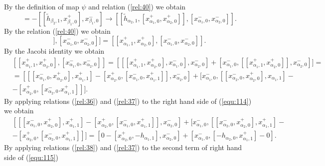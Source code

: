 \documentclass[english]{elsarticle}
\numberwithin{equation}{section}
\begin{document}
By the definition of map $\psi$ and relation (\ref{rel:40}) we obtain
\begin{equation}
    [x_{\beta_{1},1}^{+},x_{\beta_{1},0}^{-}] = -[[\tilde{h}_{\beta_2,1},x_{\beta_1,0}^+], x_{\beta_1,0}^-]\rightarrow[[\tilde{h}_{\alpha_{2},1}, [x_{\alpha_{1},0}^{+},x_{\alpha_{2},0}^{+}]], [x_{\alpha_{1},0}^{-},x_{\alpha_{2},0}^{-}]].
\end{equation}
By the relation (\ref{rel:40}) we obtain
\begin{equation}
[[\tilde{h}_{\alpha_{2},1},[x_{\alpha_{1},0}^{+},x_{\alpha_{2},0}^{+}]],[x_{\alpha_{1},0}^{-},x_{\alpha_{2},0}^{-}]] = [[x_{\alpha_{1},1}^{+},x_{\alpha_{2},0}^{+}],[x_{\alpha_{1},0}^{-},x_{\alpha_{2},0}^{-}]].
\end{equation}
By the Jacobi identity we obtain
\begin{equation}
\label{equ:114}
\begin{split}
&[[x_{\alpha_{1},1}^{+},x_{\alpha_{2},0}^{+}],[x_{\alpha_{1},0}^{-},x_{\alpha_{2},0}^{-}]]=[[[x_{\alpha_{1},1}^{+},x_{\alpha_{2},0}^{+}],x_{\alpha_{1},0}^{-}],x_{\alpha_{2},0}^{-}]+[x_{\alpha_{1},0}^{-},[[x_{\alpha_{1},1}^{+},x_{\alpha_{2},0}^{+}]],x_{\alpha_{2},0}^{-}]]=\\
&=[[[x_{\alpha_{1},0}^{-},x_{\alpha_{2},0}^{+}],x_{\alpha_{1},1}^{+}]-[x_{\alpha_{2},0}^{+},[x_{\alpha_{1},0}^{-},x_{\alpha_{1},1}^{+}]],x_{\alpha_{2},0}^{-}]+[x_{\alpha_{1},0}^{-},[[x_{\alpha_{2},0}^{-},x_{\alpha_{2},0}^{+}],x_{\alpha_{1},1}]-\\
&-[x_{\alpha_{2},0}^{+},[x_{\alpha_{2},0}^{-}.x_{\alpha_{1},1}^{+}]]].
\end{split}
\end{equation}
By applying relations (\ref{rel:36}) and (\ref{rel:37}) to the right hand side of (\ref{equ:114}) we obtain
\begin{equation}
\label{equ:115}
\begin{split}
&[[[x_{\alpha_{1},0}^{-},x_{\alpha_{2},0}^{+}],x_{\alpha_{1},1}^{+}] - [x_{\alpha_{2},0}^{+}, [x_{\alpha_{1},0}^{-},x_{\alpha_{1},1}^{+}]], x_{\alpha_{2},0}^{-}] + [x_{\alpha_{1},0}^{-}, [[x_{\alpha_{2},0}^{-}, x_{\alpha_{2},0}^{+}], x_{\alpha_{1},1}^{+}] - \\
&-[x_{\alpha_{2},0}^{+},[x_{\alpha_{2},0}^{-}, x_{\alpha_{1},1}^{+}]]] = [0-[x_{\alpha_{2},0}^{+},-h_{\alpha_{1},1}], x_{\alpha_{2},0}^{-}]+[x_{\alpha_{1},0}^{-}, [-h_{\alpha_{2},0},x_{\alpha_{1},1}^{+}]-0].
\end{split}
\end{equation}
By applying relations (\ref{rel:38}) and (\ref{rel:37}) to the second term of right hand side of (\ref{equ:115})
\end{document}
